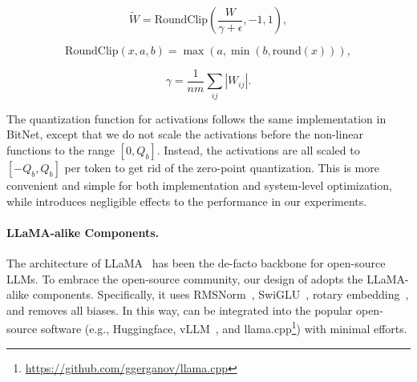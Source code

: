 \begin{equation}
    \widetilde{W} = \mathrm{RoundClip}(\frac{W}{\gamma + \epsilon}, -1, 1),
\end{equation}

\begin{equation}
    \mathrm{RoundClip}(x, a, b) = \max(a, \min(b, \mathrm{round}(x))),
\end{equation}

\begin{equation}
    \gamma = \frac{1}{nm}\sum_{ij} |W_{ij}|.
\end{equation}

The quantization function for activations follows the same implementation in BitNet, except that we do not scale the activations before the non-linear functions to the range $[0, Q_b]$. Instead, the activations are all scaled to $[-Q_b, Q_b]$ per token to get rid of the zero-point quantization. This is more convenient and simple for both implementation and system-level optimization, while introduces negligible effects to the performance in our experiments.

\paragraph{LLaMA-alike Components.}

The architecture of LLaMA~\cite{llama, llama2} has been the de-facto backbone for open-source LLMs. To embrace the open-source community, our design of  adopts the LLaMA-alike components. Specifically, it uses RMSNorm~\cite{rmsnorm}, SwiGLU~\cite{swiglu}, rotary embedding~\cite{rope}, and removes all biases. In this way,  can be integrated into the popular open-source software (e.g., Huggingface, vLLM~\cite{vllm}, and llama.cpp\footnote{\url{https://github.com/ggerganov/llama.cpp}}) with minimal efforts.

